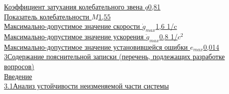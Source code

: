 \documentclass[fleqn, a4paper, 12pt, russian]{article}
\begin{document}
	{\fontsize{14pt}{0cm}\selectfont \underline{Коэффициент затухания колебательного звена $q$\hspace{4.8cm}0,81\hspace{0.6cm}}} \\ \vspace{0.2cm}
	{\fontsize{14pt}{0cm}\selectfont \underline{Показатель колебательности $M$\hspace{8.4cm}1,55\hspace{0.6cm}}} \\ \vspace{0.2cm}
	{\fontsize{14pt}{0cm}\selectfont \underline{Максимально-допустимое значение скорости $\dot{g}_{max}$\hspace{4.15cm}1,6 1/c\hspace{0.3cm}}} \\ \vspace{0.2cm}
	{\fontsize{14pt}{0cm}\selectfont \underline{Максимально-допустимое значение ускорения $\ddot{g}_{max}$\hspace{3.8cm}0,8 1/$c^2$\hspace{0.2cm}}} \\ \vspace{0.2cm}
	{\fontsize{14pt}{0cm}\selectfont \underline{Максимально-допустимое значение установившейся ошибки $e_{max}$\hspace{1cm}0,014\hspace{0.4cm}}} \\ \vspace{0.2cm}
	\newpage
	{\fontsize{14pt}{0cm}\selectfont \underline{3\hspace{0.5cm}Содержание пояснительной записки (перечень, подлежащих разработке\hspace{0.2cm}}\\\underline{\hspace{0.8cm}вопросов)\hspace{14cm}}} \\ \vspace{0.2cm}
	{\fontsize{14pt}{0cm}\selectfont \underline{\hspace{1.8cm}Введение\hspace{13.15cm}}} \\ \vspace{0.2cm}
	{\fontsize{14pt}{0cm}\selectfont \underline{\hspace{0.8cm}3.1\hspace{0.36cm}Анализ устойчивости неизменяемой части системы \hspace{3.65cm}}} \\ \vspace{0.2cm}
\end{document}
